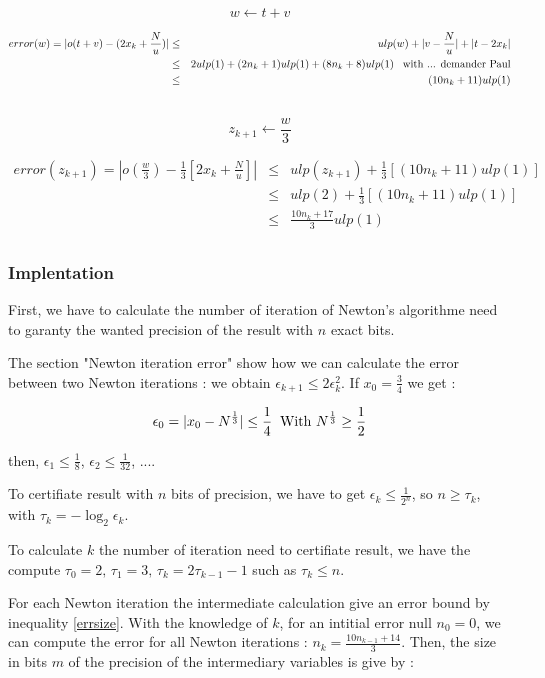 \documentclass[12pt]{amsart}
\begin{document}
\[
w \leftarrow t+v
\]

\begin{eqnarray}\nonumber
  error(w) = |o(t+v)-(2x_k + \frac{N}{u})| &\leq& ulp(w) +
  |v-\frac{N}{u}|+|t-2x_k|\\\nonumber
  &\leq& 2ulp(1) +(2 n_k + 1) ulp(1)  + (8 n_k + 8)
  ulp(1)\;\;\;{\textnormal{with ... demander Paul}}\\\nonumber
  &\leq& (10 n_k + 11) ulp(1)\\\nonumber  
\end{eqnarray}

\[
z_{k+1} \leftarrow \frac{w}{3}
\]

\begin{eqnarray}\label{errsize}
  error(z_{k+1}) = |o(\frac{w}{3})-\frac{1}{3}[2x_k + \frac{N}{u}]| &\leq& ulp(z_{k+1}) +
  \frac{1}{3}[(10 n_k + 11) ulp(1)]\\\nonumber  
&\leq& ulp(2) + \frac{1}{3}[(10 n_k + 11) ulp(1)]\\\nonumber  
  &\leq& \frac{10 n_k + 17}{3} ulp(1)\\\nonumber  
\end{eqnarray}



\subsubsection{Implentation}

First, we have to calculate the number of iteration of Newton's
algorithme need to garanty the wanted precision of the result with $n$ exact bits.

The section "Newton iteration error" show how we can calculate the
error between two Newton iterations : we obtain $\epsilon_{k+1} \leq 2
\epsilon_k^2$.  If $x_0=\frac{3}{4}$ we get :

\[
\epsilon_{0}=|x_0-N^{\frac{1}{3}}|\leq\frac{1}{4}\;\;{\textnormal{With  }}N^{\frac{1}{3}} \geq\frac{1}{2}
\]

then, $\epsilon_1 \leq \frac{1}{8}$, $\epsilon_2 \leq \frac{1}{32}$, ....


To certifiate result with $n$ bits of precision, we have to get $\epsilon_k\leq\frac{1}{2^{n}}$, so $n\geq\tau_k$, with $\tau_k=-\log_2 \epsilon_k$.

To calculate $k$ the number of iteration need to certifiate result, we have the compute $\tau_0=2,\, \tau_1=3,\, \tau_{k}=2\tau_{k-1} -1$ such as $\tau_k \leq n$.

For each Newton iteration the intermediate calculation give an error bound by inequality \ref{errsize}. With the knowledge of $k$, for an intitial error null $n_0=0$, we can compute the error for all Newton iterations : $n_{k} = \frac{10 n_{k-1}+14}{3}$. Then, the size in bits $m$ of the precision of the intermediary variables is give by :
\end{document}
